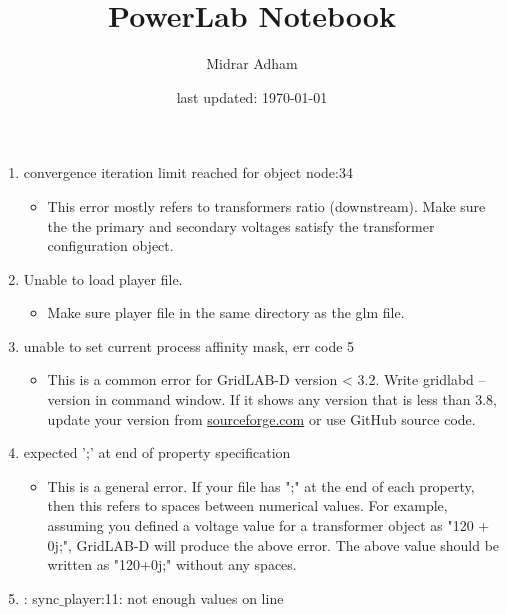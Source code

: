 \documentclass{article}
\title{PowerLab Notebook}
\author{Midrar Adham}
\date{last updated: \today}
\begin{document}
    \maketitle
    \newpage
    
    \tableofcontents
    \newpage
    
    
    \printacronyms[type=\acronymtype, nonumberlist]

    \newpage
    \listoferrors
    \begin{enumerate}
        \item convergence iteration limit reached for object node:34
    \begin{itemize}
        \item  This error mostly refers to transformers ratio (downstream). Make sure the the primary and secondary voltages satisfy the transformer configuration object.
    \end{itemize}
        \item Unable to load player file.
        \begin{itemize}
            \item Make sure player file in the same directory as the glm file.
        \end{itemize}
        \item unable to set current process affinity mask, err code 5
        \begin{itemize}
            \item This is a common error for GridLAB-D version < 3.2. Write gridlabd --version in command window. If it shows any version that is less than 3.8, update your version from \url{sourceforge.com} or use GitHub source code.
        \end{itemize}
        \item expected ';' at end of property specification
        \begin{itemize}
            \item This is a general error. If your file has ";" at the end of each property, then this refers to spaces between numerical values. For example, assuming you defined a voltage value for a transformer object as "120 + 0j;", GridLAB-D will produce the above error. The above value should be written as "120+0j;" without any spaces.
        \end{itemize}
        \item : sync$\_$player:11: not enough values on line

\end{enumerate}
\end{document}
